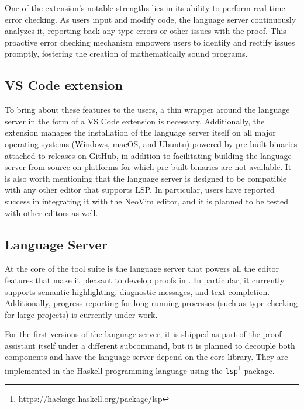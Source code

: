 One of the extension's notable strengths lies in its ability to perform real-time error checking.
As users input and modify code, the language server continuously analyzes it,
reporting back any type errors or other issues with the proof.
This proactive error checking mechanism empowers users to identify and rectify issues promptly,
fostering the creation of mathematically sound programs.

\subsection{VS Code extension}

To bring about these features to the users, a thin wrapper around the language server in the form of a VS Code extension is necessary.
Additionally, the extension manages the installation of the language server itself on all major operating systems (Windows, macOS, and Ubuntu)
powered by pre-built binaries attached to releases on GitHub,
in addition to facilitating building the language server from source on platforms
for which pre-built binaries are not available.
It is also worth mentioning that the language server is designed to be compatible
with any other editor that supports LSP.
In particular, users have reported success in integrating it with the NeoVim editor,
and it is planned to be tested with other editors as well.

\subsection{\Rzk{} Language Server}

At the core of the \Rzk{} tool suite is the language server that powers all the editor features that make it pleasant to develop proofs in \Rzk{}. In particular, it currently supports semantic highlighting, diagnostic messages, and text completion. Additionally, progress reporting for long-running processes (such as type-checking for large projects) is currently under work.

For the first versions of the language server, it is shipped as part of the \Rzk{} proof assistant itself under a different subcommand, but it is planned to decouple both components and have the language server depend on the core library. They are implemented in the Haskell programming language using the \texttt{lsp}\footnote{\url{https://hackage.haskell.org/package/lsp}} package.
